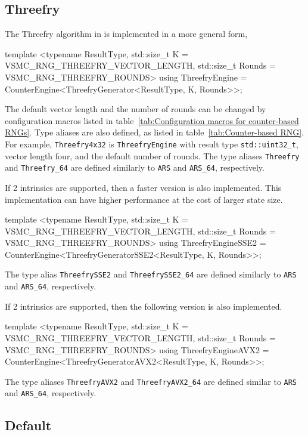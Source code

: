 \subsection{Threefry}
\label{sub:Threefry}

The Threefry algorithm in \textcite{Salmon:2011um} is implemented in a more
general form,
\begin{cppcode}
  template <typename ResultType, std::size_t K = VSMC_RNG_THREEFRY_VECTOR_LENGTH,
      std::size_t Rounds = VSMC_RNG_THREEFRY_ROUNDS>
  using ThreefryEngine = CounterEngine<ThreefryGenerator<ResultType, K, Rounds>>;
\end{cppcode}
The default vector length and the number of rounds can be changed by
configuration macros listed in table~\ref{tab:Configuration macros for
  counter-based RNGs}. Type aliases are also defined, as listed in
table~\ref{tab:Counter-based RNG}. For example, \verb|Threefry4x32| is
\verb|ThreefryEngine| with result type \verb|std::uint32_t|, vector length
four, and the default number of rounds. The type aliases \verb|Threefry| and
\verb|Threefry_64| are defined similarly to \verb|ARS| and \verb|ARS_64|,
respectively.

If \sse{}2 intrinsics are supported, then a faster version is also implemented.
This implementation can have higher performance at the cost of larger state
size.
\begin{cppcode}
  template <typename ResultType, std::size_t K = VSMC_RNG_THREEFRY_VECTOR_LENGTH,
      std::size_t Rounds = VSMC_RNG_THREEFRY_ROUNDS>
  using ThreefryEngineSSE2 =
      CounterEngine<ThreefryGeneratorSSE2<ResultType, K, Rounds>>;
\end{cppcode}
The type alias \verb|ThreefrySSE2| and \verb|ThreefrySSE2_64| are defined
similarly to \verb|ARS| and \verb|ARS_64|, respectively.

If \avx{}2 intrinsics are supported, then the following version is also
implemented.
\begin{cppcode}
  template <typename ResultType, std::size_t K = VSMC_RNG_THREEFRY_VECTOR_LENGTH,
      std::size_t Rounds = VSMC_RNG_THREEFRY_ROUNDS>
  using ThreefryEngineAVX2 =
      CounterEngine<ThreefryGeneratorAVX2<ResultType, K, Rounds>>;
\end{cppcode}
The type aliases \verb|ThreefryAVX2| and \verb|ThreefryAVX2_64| are defined
similar to \verb|ARS| and \verb|ARS_64|, respectively.

\subsection{Default \protect\rng}
\label{sub:Default RNG}

